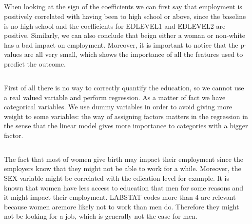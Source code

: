 \documentclass[11pt]{article}\usepackage[]{graphicx}\usepackage[]{color}
\begin{document}
\subsection{}
When looking at the sign of the coefficients we can first say that employment is positively correlated with having been to high school or above, since the baseline is no high school and the coefficients for EDLEVEL1 and EDLEVEL2 are positive. Similarly, we can also conclude that beign either a woman or non-white has a bad impact 
on employment.
Moreover, it is important to notice that the p-values are all very small, which shows the importance of all the features used to predict the outcome.

\subsection{}

First of all there is no way to correctly quantify the education, so we cannot use a real valued variable and perform regression. As a matter of fact we have categorical variables. We use dummy variables in order to avoid giving more weight to some variables: the way of assigning factors matters in the regression in the sense that the linear model gives more importance to categories with a bigger factor.
\subsection{}
The fact that most of women give birth may impact their employment since the employers know that they might not be able to work for a while.
Moreover, the SEX variable might be correlated with the edication level for example. It is known that women have less access to education that men for some reasons and it might impact their employment.
LABSTAT codes more than 4 are relevant because women aremore likely not to work than men do. Therefore they might not be looking for a job, which is generally not the case for men.
\end{document}
